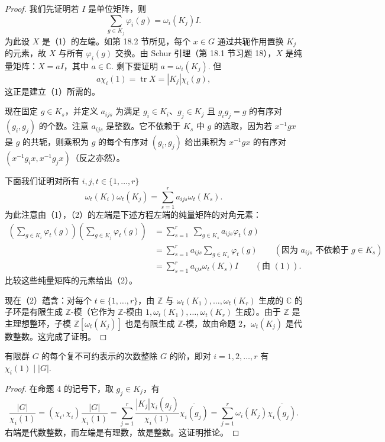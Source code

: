 \begin{proof}
我们先证明若 \(I\) 是单位矩阵，则
\[
\sum_{g \in K_j}\varphi_i(g) = \omega_i(K_j)I. \tag{19.1}
\]
为此设 \(X\) 是（1）的左端。如第 18.2 节所见，每个 \(x \in G\) 通过共轭作用置换 \(K_j\) 的元素，故 \(X\) 与所有 \(\varphi_i(g)\) 交换。由 Schur 引理（第 18.1 节习题 18），\(X\) 是纯量矩阵：\(X = aI\)，其中 \(a \in \mathbb{C}\). 剩下要证明 \(a = \omega_i(K_j)\). 但
\[
a\chi_i(1) = \operatorname{tr}X = |K_j|\chi_i(g),
\]
这正是建立（1）所需的。

现在固定 \(g \in K_s\)，并定义 \(a_{ijs}\) 为满足 \(g_i \in K_i\)、\(g_j \in K_j\) 且 \(g_ig_j = g\) 的有序对 \((g_i, g_j)\) 的个数。注意 \(a_{ijs}\) 是整数。它不依赖于 \(K_s\) 中 \(g\) 的选取，因为若 \(x^{-1}gx\) 是 \(g\) 的共轭，则乘积为 \(g\) 的每个有序对 \((g_i, g_j)\) 给出乘积为 \(x^{-1}gx\) 的有序对 \((x^{-1}g_ix, x^{-1}g_jx)\)（反之亦然）。

下面我们证明对所有 \(i, j, t \in \{1, \ldots, r\}\)
\[
\omega_t(K_i)\omega_t(K_j) = \sum_{s=1}^{r}a_{ijs}\omega_t(K_s). \tag{19.2}
\]
为此注意由（1），（2）的左端是下述方程左端的纯量矩阵的对角元素：
\[
\begin{aligned}
\left(\sum_{g \in K_i}\varphi_t(g)\right)\left(\sum_{g \in K_j}\varphi_t(g)\right) &= \sum_{s=1}^{r}\ \sum_{g \in K_s}a_{ijs}\varphi_t(g)\\
&= \sum_{s=1}^{r}a_{ijs}\sum_{g \in K_s}\varphi_t(g) \qquad (\text{因为 } a_{ijs} \text{ 不依赖于 } g \in K_s)\\
&= \sum_{s=1}^{r}a_{ijs}\omega_t(K_s)I \qquad (\text{由 }(1)).
\end{aligned}
\]
比较这些纯量矩阵的元素给出（2）。

现在（2）蕴含：对每个 \(t \in \{1, \ldots, r\}\)，由 \(\mathbb{Z}\) 与 \(\omega_t(K_1), \ldots, \omega_t(K_r)\) 生成的 \(\mathbb{C}\) 的子环是有限生成 \(\mathbb{Z}\)-模（它作为 \(\mathbb{Z}\)-模由 \(1, \omega_t(K_1), \ldots, \omega_t(K_r)\) 生成）。由于 \(\mathbb{Z}\) 是主理想整环，子模 \(\mathbb{Z}[\omega_t(K_j)]\) 也是有限生成 \(\mathbb{Z}\)-模，故由命题 2，\(\omega_t(K_j)\) 是代数整数。这完成了证明。
\end{proof}

\begin{corollary}\label{cor:19.5}
有限群 \(G\) 的每个复不可约表示的次数整除 \(G\) 的阶，即对 \(i = 1, 2, \ldots, r\) 有 \(\chi_i(1) \mid |G|\).
\end{corollary}

\begin{proof}
在命题 4 的记号下，取 \(g_j \in K_j\)，有
\[
\frac{|G|}{\chi_i(1)} = (\chi_i, \chi_i)\frac{|G|}{\chi_i(1)} = \sum_{j=1}^{r}\frac{|K_j|\chi_i(g_j)}{\chi_i(1)}\overline{\chi_i(g_j)} = \sum_{j=1}^{r}\omega_i(K_j)\overline{\chi_i(g_j)}.
\]
右端是代数整数，而左端是有理数，故是整数。这证明推论。
\end{proof}

